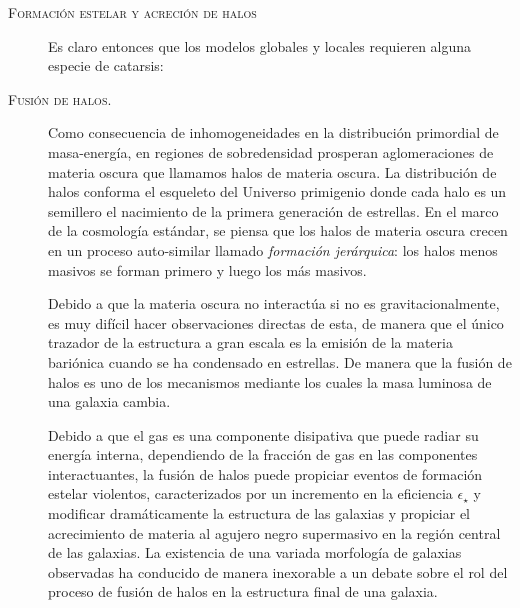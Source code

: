 \documentclass[xcolor=dvipsnames,4pt,hyperref={colorlinks,citecolor=black,linkcolor=black,urlcolor=black}]{beamer}
\begin{document}
\begin{frame}[allowframebreaks]{\textsc{Formación estelar y acreción de halos}}
\begin{description}
Es claro entonces que los modelos globales y locales requieren alguna especie de catarsis:

\item[\textsc{Fusión de halos.}] Como consecuencia de inhomogeneidades en la distribución primordial
de masa-energía, en regiones de sobredensidad prosperan aglomeraciones de materia oscura que
llamamos halos de materia oscura. La distribución de halos conforma el esqueleto del Universo
primigenio donde cada halo es un semillero el nacimiento de la primera generación de estrellas. En
el marco de la cosmología estándar, se piensa que los halos de materia oscura crecen en un proceso
auto-similar llamado \emph{formación jerárquica}: los halos menos masivos se forman primero y luego
los más masivos.

Debido a que la materia oscura no interactúa si no es gravitacionalmente, es muy difícil hacer
observaciones directas de esta, de manera que el único trazador de la estructura a gran escala es la
emisión de la materia bariónica cuando se ha condensado en estrellas. De manera que la fusión de
halos es uno de los mecanismos mediante los cuales la masa luminosa de una galaxia cambia.

Debido a que el gas es una componente disipativa que puede radiar su energía interna, dependiendo de
la fracción de gas en las componentes interactuantes, la fusión de halos puede propiciar eventos de
formación estelar violentos, caracterizados por un incremento en la eficiencia $\epsilon_\star$ y
modificar dramáticamente la estructura de las galaxias y propiciar el acrecimiento de materia al
agujero negro supermasivo en la región central de las galaxias. La existencia de una variada
morfología de galaxias observadas ha conducido de manera inexorable a un debate sobre el rol del
proceso de fusión de halos en la estructura final de una galaxia.


\end{description}
\end{frame}
\end{document}
